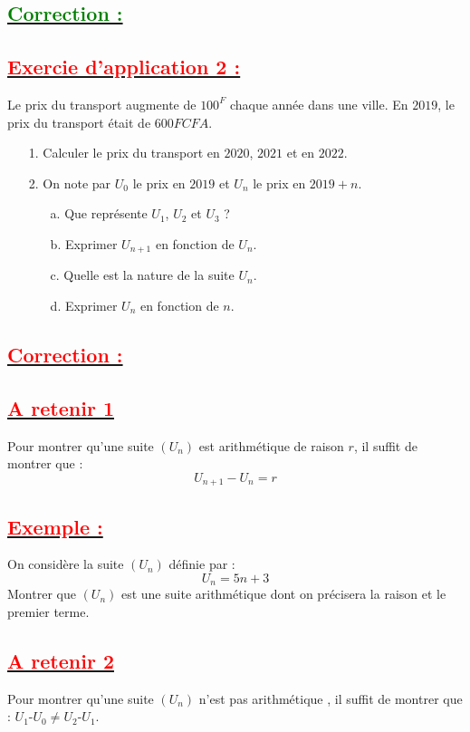 \documentclass[12pt]{article}
\begin{document}
\subsection*{\underline{\textbf{\textcolor{green}{Correction :}}}}
\subsection*{\underline{\textbf{\textcolor{red}{Exercie d'application 2 :}}}}
Le prix du transport augmente de $100^{F}$ chaque année dans une ville. En $2019$, le prix du transport était de $600FCFA$.
\begin{itemize}
\item[1.]Calculer le prix du transport en $2020$, $2021$ et en $2022.$
\item[2.]On note par $U_{0}$ le prix en $2019$ et $U_{n}$ le prix en $2019 + n.$
\begin{itemize}
	\item[a.]Que représente $U_{1}$, $U_{2}$ et $U_{3}$ ?
	\item[b.]Exprimer $U_{n+1}$ en fonction de $U_{n}.$
	\item[c.]Quelle est la nature de la suite $U_{n}.$
	\item[d.]Exprimer $U_{n}$ en fonction de $n$.
\end{itemize}
\end{itemize}
\subsection*{\underline{\textbf{\textcolor{red}{Correction :}}}}
\subsection*{\underline{\textbf{\textcolor{red}{A retenir 1 }}}}
Pour montrer qu'une suite $(U_n)$ est arithmétique de raison $r$, il suffit de montrer que :
\[ U_{n+1} - U_n = r \]
\subsection*{\underline{\textbf{\textcolor{red}{Exemple :}}}}
On considère la suite $(U_n)$ définie par :\[ U_n = 5n + 3 \]
Montrer que $(U_n)$ est une suite arithmétique dont on précisera la raison et le premier terme.
\subsection*{\underline{\textbf{\textcolor{red}{A retenir 2}}}}
Pour montrer qu’une suite $(U_n)$ n’est pas arithmétique , il suffit de montrer que : 
$U_{1}$-$U_{0}\neq U_{2}$-$U_{1}$.
\end{document}
